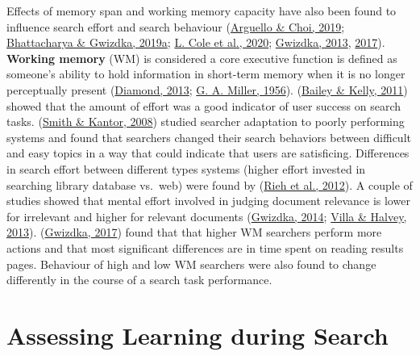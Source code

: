 \documentclass[letterpaper, nobind]{templates/ociamthesis}
\begin{document}
Effects of memory span and working memory capacity have also been found
to influence search effort and search behaviour
(\protect\hyperlink{ref-arguello2019effects}{Arguello \& Choi, 2019}; \protect\hyperlink{ref-CHIIR19}{Bhattacharya \& Gwizdka, 2019a}; \protect\hyperlink{ref-cole2020more}{L. Cole et al., 2020}; \protect\hyperlink{ref-gwizdka2013effects}{Gwizdka, 2013}, \protect\hyperlink{ref-gwizdka2017can}{2017}).
\textbf{Working memory} (WM) is considered a core executive function is
defined as someone's ability to hold information in short-term memory
when it is no longer perceptually present
(\protect\hyperlink{ref-diamond2013executive}{Diamond, 2013}; \protect\hyperlink{ref-miller1956magical}{G. A. Miller, 1956}). (\protect\hyperlink{ref-bailey2011amount}{Bailey \& Kelly, 2011}) showed
that the amount of effort was a good indicator of user success on search
tasks. (\protect\hyperlink{ref-smith2008user}{Smith \& Kantor, 2008}) studied searcher adaptation to poorly performing
systems and found that searchers changed their search behaviors between
difficult and easy topics in a way that could indicate that users are
satisficing. Differences in search effort between different types
systems (higher effort invested in searching library database vs.~web)
were found by (\protect\hyperlink{ref-rieh2012amount}{Rieh et al., 2012}). A couple of studies showed that mental
effort involved in judging document relevance is lower for irrelevant
and higher for relevant documents (\protect\hyperlink{ref-37}{Gwizdka, 2014}; \protect\hyperlink{ref-villa2013relevance}{Villa \& Halvey, 2013}).
(\protect\hyperlink{ref-gwizdka2017can}{Gwizdka, 2017}) found that that higher WM searchers perform more
actions and that most significant differences are in time spent on
reading results pages. Behaviour of high and low WM searchers were also
found to change differently in the course of a search task performance.

\hypertarget{assessing-learning-during-search}{%
\section{Assessing Learning during Search}\label{assessing-learning-during-search}}
\end{document}
